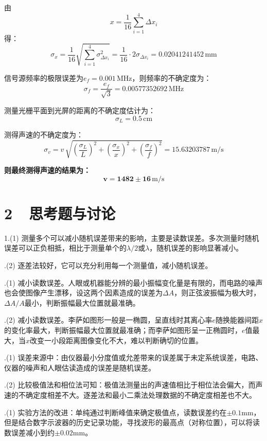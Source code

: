 \documentclass[a4paper,fontset=windows]{ctexart}
\begin{document}
    由
    \[
    x = \frac{1}{16}\sum_{i=1}^{4}\Delta x_i
    \]
    得：
    \[
    \sigma_{x} = \frac{1}{16}\sqrt{\sum_{i=1}^{4}\sigma_{\Delta x_i}^2} = \frac{1}{16}\cdot2\sigma_{\Delta x_i} = 0.02041241452\,\mathrm{mm}
    \]

    信号源频率的极限误差为$e_f = 0.001\,\mathrm{MHz}$，则频率的不确定度为：
    \[
    \sigma_f = \frac{e_f}{\sqrt{3}} = 0.00577352692\,\mathrm{MHz}
    \]

    测量光栅平面到光屏的距离的不确定度估计为：
    \[
    \sigma_L=0.5\,\mathrm{cm}
    \]

    测得声速的不确定度为：
    \[
    \sigma_v = v \,\sqrt{\left(\frac{\sigma_{L}}{L}\right)^2 + \left(\frac{\sigma_{x}}{x}\right)^2 + \left(\frac{\sigma_f}{f}\right)^2} = 15.63203787\,\mathrm{m/s}
    \]

    \textbf{则最终测得声速的结果为：}
    \[
    \boldsymbol{v = 1482\pm16\,\mathrm{m/s}}
    \]

    \newpage
    \section*{ 2\ \ 思考题与讨论}

    1.(1) 测量多个可以减小随机误差带来的影响，主要是读数误差。多次测量时随机误差可以正负相抵，相比于测量单个的$\lambda/2$或$\lambda$，随机误差的影响显著减小。

    .(2) 逐差法较好，它可以充分利用每一个测量值，减小随机误差。

    .(1) 减小读数误差。人眼或机器能分辨的最小振幅变化量是有限的，而电路的噪声也会使图像产生漂移，设这两个因素造成的误差为$\Delta A$，则正弦波振幅为极大时，$\Delta A/A$最小，判断振幅最大位置就最准确。

    .(2) 减小读数误差。李萨如图形一般是一椭圆，呈直线时其离心率$e$随换能器间距$x$的变化率最大，判断振幅最大位置就最准确；而李萨如图形呈一正椭圆时，$e$值最大，当$x$改变一小段距离图像变化不大，难以判断确切的位置。

    .(1) 误差来源中：由仪器最小分度值或允差带来的误差属于未定系统误差，电路、仪器的噪声和人眼估读造成的误差是随机误差。

    .(2) 比较极值法和相位法可知：极值法测量出的声速值相比于相位法会偏大，而声速的不确定度相差不大。逐差法和最小二乘法处理数据的不确定度相差也不大。

    .(1) 实验方法的改进：单纯通过判断峰值来确定极值点，读数误差约在$\pm0.1\mathrm{mm}$，但是结合数字示波器的历史记录功能，寻找波形的最高点（对称位置），可以将读数误差减小到约$\pm0.02\mathrm{mm}$。
\end{document}
